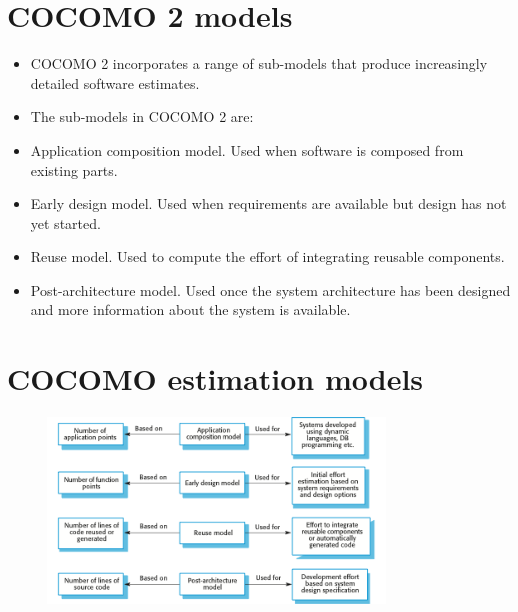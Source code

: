 \section{COCOMO 2 models}
\begin{itemize}

\item COCOMO 2 incorporates a range of sub-models that produce increasingly detailed software estimates.

\item The sub-models in COCOMO 2 are:

  \item Application composition model. Used when software is composed from existing parts.
  \item Early design model. Used when requirements are available but design has not yet started.
  \item Reuse model. Used to compute the effort of integrating reusable components.
  \item Post-architecture model. Used once the system architecture has been designed and more information about the system is available.
\end{itemize}

\section{COCOMO estimation models}
\begin{figure}[h!]
    \centering
    \includegraphics[width = 0.8\textwidth]{./figures/L6_7.png}
    \caption{}
    \label{fig:L6_7}
\end{figure}

